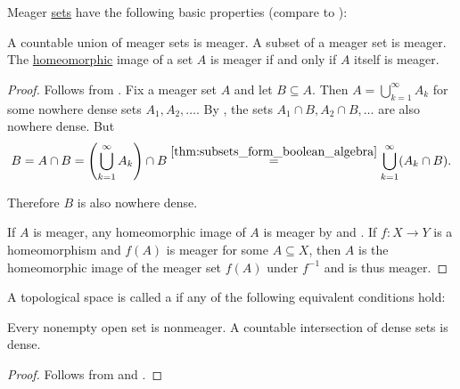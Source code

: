 \begin{proposition}\label{thm:meager_set_properties}
  Meager \hyperref[def:meager_set]{sets} have the following basic properties (compare to ):
  \begin{PropEnum}
     A countable union of meager sets is meager.
     A subset of a meager set is meager.
     The \hyperref[def:homeomorphism]{homeomorphic} image of a set \( A \) is meager if and only if \( A \) itself is meager.
  \end{PropEnum}
\end{proposition}
\begin{proof}
   Follows from .
   Fix a meager set \( A \) and let \( B \subseteq A \). Then \( A = \bigcup_{k=1}^\infty A_k \) for some nowhere dense sets \( A_1, A_2, \ldots \). By , the sets \( A_1 \cap B, A_2 \cap B, \ldots \) are also nowhere dense. But
  \begin{equation*}
    B
    =
    A \cap B
    =
    \left(\bigcup_{k=1}^\infty A_k \right) \cap B
    \overset {\ref{thm:subsets_form_boolean_algebra}} =
    \bigcup_{k=1}^\infty (A_k \cap B).
  \end{equation*}

  Therefore \( B \) is also nowhere dense.

  \mbox{}
  \Necessity If \( A \) is meager, any homeomorphic image of \( A \) is meager by  and .
  \Sufficiency If \( f: X \to Y \) is a homeomorphism and \( f(A) \) is meager for some \( A \subseteq X \), then \( A \) is the homeomorphic image of the meager set \( f(A) \) under \( f^{-1} \) and is thus meager.
\end{proof}

\begin{definition}\label{def:baire_space}
  A topological space is called a  if any of the following equivalent conditions hold:
  \begin{DefEnum}
     Every nonempty open set is nonmeager.
     A countable intersection of dense sets is dense.
  \end{DefEnum}
\end{definition}
\begin{proof}
   Follows from  and .
\end{proof}

